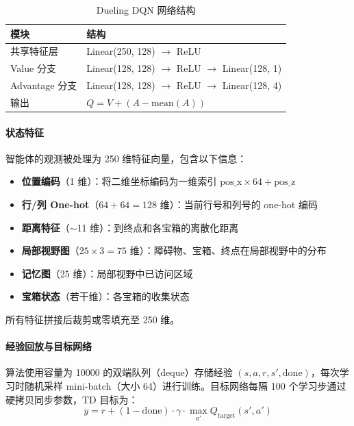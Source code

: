 \documentclass[12pt,a4paper]{article}
\begin{document}
\begin{table}[htbp]
\centering
\caption{Dueling DQN 网络结构}\label{tab:hw1_net}
\begin{tabular}{ll}
\toprule
\textbf{模块} & \textbf{结构} \\
\midrule
共享特征层       & Linear(250, 128) $\to$ ReLU \\
Value 分支      & Linear(128, 128) $\to$ ReLU $\to$ Linear(128, 1) \\
Advantage 分支  & Linear(128, 128) $\to$ ReLU $\to$ Linear(128, 4) \\
输出            & $Q = V + (A - \text{mean}(A))$ \\
\bottomrule
\end{tabular}
\end{table}

\paragraph{状态特征}
智能体的观测被处理为 250 维特征向量，包含以下信息：

\begin{itemize}[nosep]
\item \textbf{位置编码}（1 维）：将二维坐标编码为一维索引 $\text{pos\_x} \times 64 + \text{pos\_z}$
\item \textbf{行/列 One-hot}（$64+64=128$ 维）：当前行号和列号的 one-hot 编码
\item \textbf{距离特征}（$\sim$11 维）：到终点和各宝箱的离散化距离
\item \textbf{局部视野图}（$25\times3=75$ 维）：障碍物、宝箱、终点在局部视野中的分布
\item \textbf{记忆图}（25 维）：局部视野中已访问区域
\item \textbf{宝箱状态}（若干维）：各宝箱的收集状态
\end{itemize}

所有特征拼接后裁剪或零填充至 250 维。

\paragraph{经验回放与目标网络}
算法使用容量为 10000 的双端队列（deque）存储经验 $(s, a, r, s', \text{done})$，每次学习时随机采样 mini-batch（大小 64）进行训练。目标网络每隔 100 个学习步通过硬拷贝同步参数，TD 目标为：
\begin{equation}
y = r + (1 - \text{done}) \cdot \gamma \cdot \max_{a'} Q_{\text{target}}(s', a')
\end{equation}
\end{document}
